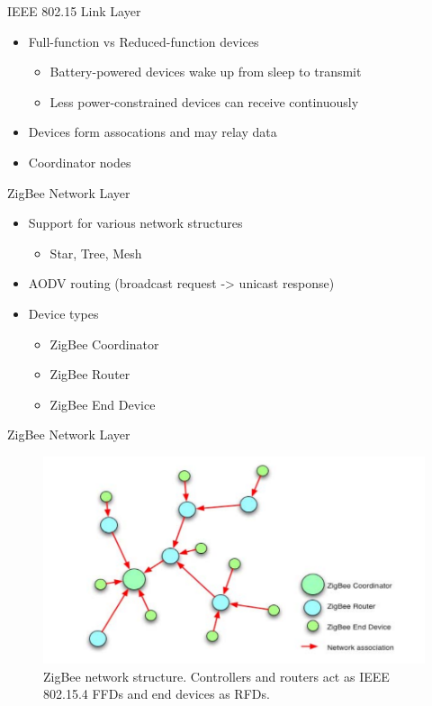 \documentclass{beamer}
\begin{document}
\begin{frame}{IEEE 802.15 Link Layer}
  \begin{itemize}
    \item Full-function vs Reduced-function devices
	\begin{itemize}
  		\item Battery-powered devices wake up from sleep to transmit
  		\item Less power-constrained devices can receive continuously
	\end{itemize}
	
  	\item Devices form assocations and may relay data
  	\item Coordinator nodes
  \end{itemize}
\end{frame}

\begin{frame}{ZigBee Network Layer}
  \begin{itemize}
  	\item Support for various network structures
  	\begin{itemize}
  		\item Star, Tree, Mesh
  	\end{itemize}
  	\item AODV routing (broadcast request -> unicast response)
  	\item Device types
  	\begin{itemize}
  		\item ZigBee Coordinator
  		\item ZigBee Router
  		\item ZigBee End Device
  	\end{itemize}
  \end{itemize}
\end{frame}

\begin{frame}{ZigBee Network Layer}
  \begin{figure}
  \includegraphics[width=\textwidth]{zbnetstructure.png}
  \caption{ZigBee network structure. Controllers and routers act as IEEE 802.15.4 FFDs and end devices as RFDs.}
  \end{figure}
\end{frame}
\end{document}
